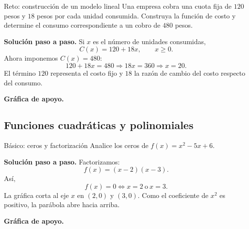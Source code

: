 \documentclass[aspectratio=169,10pt]{beamer}
\begin{document}
\begin{frame}{Reto: construcción de un modelo lineal}
Una empresa cobra una cuota fija de $120$ pesos y $18$ pesos por cada unidad consumida. Construya la función de costo y determine el consumo correspondiente a un cobro de $480$ pesos.

\textbf{Solución paso a paso.} Si $x$ es el número de unidades consumidas,
\[
C(x)=120+18x,\qquad x\ge0.
\]
Ahora imponemos $C(x)=480$:
\[
120+18x=480\Longrightarrow 18x=360\Longrightarrow \boxed{x=20}.
\]
El término $120$ representa el costo fijo y $18$ la razón de cambio del costo respecto del consumo.


\textbf{Gráfica de apoyo.}\medskip
\begin{center}
\end{center}

\end{frame}

\subsection{Funciones cuadráticas y polinomiales}

\begin{frame}{Básico: ceros y factorización}
Analice los ceros de $f(x)=x^2-5x+6$.

\textbf{Solución paso a paso.} Factorizamos:
\[
f(x)=(x-2)(x-3).
\]
Así,
\[
f(x)=0\Longleftrightarrow x=2\ \text{o}\ x=3.
\]
La gráfica corta al eje $x$ en $(2,0)$ y $(3,0)$. Como el coeficiente de $x^2$ es positivo, la parábola abre hacia arriba.


\textbf{Gráfica de apoyo.}\medskip
\begin{center}
\end{center}

\end{frame}
\end{document}
